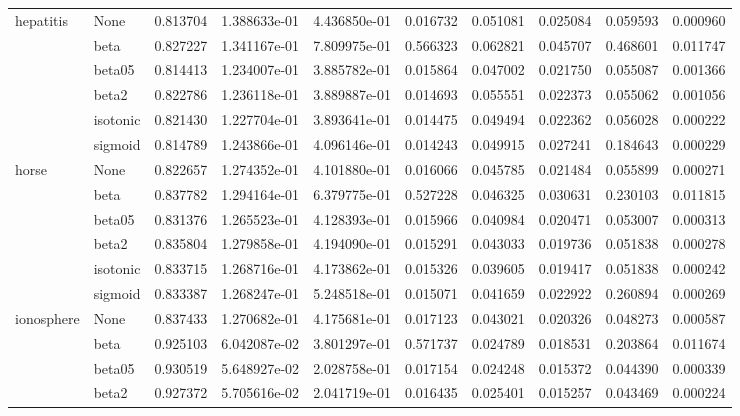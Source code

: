 \begin{tabular}{llrrrrrrrr}
hepatitis & None &  0.813704 &  1.388633e-01 &  4.436850e-01 &   0.016732 &  0.051081 &  0.025084 &  0.059593 &  0.000960 \\
        & beta &  0.827227 &  1.341167e-01 &  7.809975e-01 &   0.566323 &  0.062821 &  0.045707 &  0.468601 &  0.011747 \\
        & beta05 &  0.814413 &  1.234007e-01 &  3.885782e-01 &   0.015864 &  0.047002 &  0.021750 &  0.055087 &  0.001366 \\
        & beta2 &  0.822786 &  1.236118e-01 &  3.889887e-01 &   0.014693 &  0.055551 &  0.022373 &  0.055062 &  0.001056 \\
        & isotonic &  0.821430 &  1.227704e-01 &  3.893641e-01 &   0.014475 &  0.049494 &  0.022362 &  0.056028 &  0.000222 \\
        & sigmoid &  0.814789 &  1.243866e-01 &  4.096146e-01 &   0.014243 &  0.049915 &  0.027241 &  0.184643 &  0.000229 \\
horse & None &  0.822657 &  1.274352e-01 &  4.101880e-01 &   0.016066 &  0.045785 &  0.021484 &  0.055899 &  0.000271 \\
        & beta &  0.837782 &  1.294164e-01 &  6.379775e-01 &   0.527228 &  0.046325 &  0.030631 &  0.230103 &  0.011815 \\
        & beta05 &  0.831376 &  1.265523e-01 &  4.128393e-01 &   0.015966 &  0.040984 &  0.020471 &  0.053007 &  0.000313 \\
        & beta2 &  0.835804 &  1.279858e-01 &  4.194090e-01 &   0.015291 &  0.043033 &  0.019736 &  0.051838 &  0.000278 \\
        & isotonic &  0.833715 &  1.268716e-01 &  4.173862e-01 &   0.015326 &  0.039605 &  0.019417 &  0.051838 &  0.000242 \\
        & sigmoid &  0.833387 &  1.268247e-01 &  5.248518e-01 &   0.015071 &  0.041659 &  0.022922 &  0.260894 &  0.000269 \\
ionosphere & None &  0.837433 &  1.270682e-01 &  4.175681e-01 &   0.017123 &  0.043021 &  0.020326 &  0.048273 &  0.000587 \\
        & beta &  0.925103 &  6.042087e-02 &  3.801297e-01 &   0.571737 &  0.024789 &  0.018531 &  0.203864 &  0.011674 \\
        & beta05 &  0.930519 &  5.648927e-02 &  2.028758e-01 &   0.017154 &  0.024248 &  0.015372 &  0.044390 &  0.000339 \\
        & beta2 &  0.927372 &  5.705616e-02 &  2.041719e-01 &   0.016435 &  0.025401 &  0.015257 &  0.043469 &  0.000224 \\

\end{tabular}
